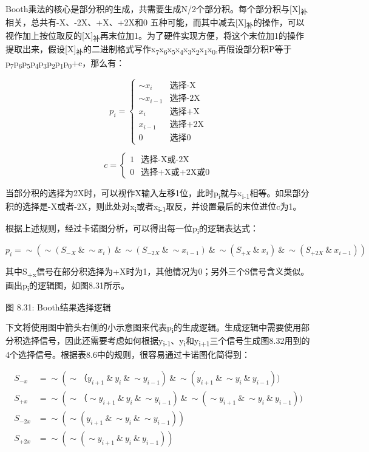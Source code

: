 \documentclass[]{ctexbook}
\begin{document}
Booth乘法的核心是部分积的生成，共需要生成N/2个部分积。每个部分积与{[}X{]}\textsubscript{补}相关，总共有-X、-2X、+X、+2X和0 五种可能，而其中减去{[}X{]}\textsubscript{补}的操作，可以视作加上按位取反的{[}X{]}\textsubscript{补}再末位加1。为了硬件实现方便，将这个末位加1的操作提取出来，假设{[}X{]}\textsubscript{补}的二进制格式写作x\textsubscript{7}x\textsubscript{6}x\textsubscript{5}x\textsubscript{4}x\textsubscript{3}x\textsubscript{2}x\textsubscript{1}x\textsubscript{0},再假设部分积P等于p\textsubscript{7}p\textsubscript{6}p\textsubscript{5}p\textsubscript{4}p\textsubscript{3}p\textsubscript{2}p\textsubscript{1}p\textsubscript{0}+c，那么有：

\[p_{i}=
\begin{cases}
\sim x_{i}& \text{选择-X}\\
\sim x_{i-1}&  \text{选择-2X}\\
x_{i}& \text{选择+X}\\
x_{i-1}& \text{选择+2X}\\
0& \text{选择0}
\end{cases}\]

\[c=
\begin{cases}
1& \text{选择-X或-2X}\\
0& \text{选择+X或+2X或0}
\end{cases}\]

当部分积的选择为2X时，可以视作X输入左移1位，此时p\textsubscript{i}就与x\textsubscript{i-1}相等。如果部分积的选择是-X或者-2X，则此处对x\textsubscript{i}或者x\textsubscript{i-1}取反，并设置最后的末位进位c为1。

根据上述规则，经过卡诺图分析，可以得出每一位p\textsubscript{i}的逻辑表达式：

\[p_{i}=\sim (\sim (S_{-X}\ \&\ \sim x_{i})\ \&\ \sim (S_{-2X}\ \&\ \sim x_{i-1})\ \&\ \sim (S_{+X}\ \&\ x_{i})\ \&\ \sim (S_{+2X}\ \&\ x_{i-1}))\]

其中S\textsubscript{+x}信号在部分积选择为+X时为1，其他情况为0；另外三个S信号含义类似。画出p\textsubscript{i}的逻辑图，如图8.31所示。

图 8.31: Booth结果选择逻辑

下文将使用图中箭头右侧的小示意图来代表p\textsubscript{i}的生成逻辑。生成逻辑中需要使用部分积选择信号，因此还需要考虑如何根据y\textsubscript{i-1}、y\textsubscript{i}和y\textsubscript{i+1}三个信号生成图8.32用到的4个选择信号。根据表8.6中的规则，很容易通过卡诺图化简得到：

\[\begin{aligned}S_{-x}&=\sim (\sim（y_{i+1}\ \&\ y_{i}\ \&\ \sim y_{i-1})\ \&\ \sim (y_{i+1}\ \&\ \sim y_{i}\ \&\ y_{i-1})) \\ S_{+x}&=\sim (\sim（\sim y_{i+1}\ \&\ y_{i}\ \&\ \sim y_{i-1})\ \&\ \sim (\sim y_{i+1}\ \&\ \sim y_{i}\ \&\ y_{i-1})) \\ S_{-2x}&=\sim (\sim (y_{i+1}\ \&\ \sim y_{i}\ \&\ \sim y_{i-1})) \\ S_{+2x}&=\sim (\sim (\sim y_{i+1}\ \&\ y_{i}\ \&\ y_{i-1}))\end{aligned}\]
\end{document}

